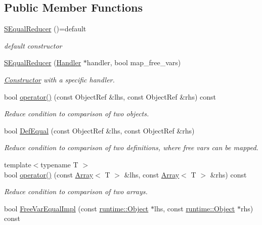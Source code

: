 \subsection*{Public Member Functions}
\begin{DoxyCompactItemize}
\item 
\hyperlink{classtvm_1_1SEqualReducer_abb85d3142af880fb96ae79423e5c382e}{S\+Equal\+Reducer} ()=default
\begin{DoxyCompactList}\small\item\em default constructor \end{DoxyCompactList}\item 
\hyperlink{classtvm_1_1SEqualReducer_a2562e028a0298c0e45d5ebbb98545fa4}{S\+Equal\+Reducer} (\hyperlink{classtvm_1_1SEqualReducer_1_1Handler}{Handler} $\ast$handler, bool map\+\_\+free\+\_\+vars)
\begin{DoxyCompactList}\small\item\em \hyperlink{classtvm_1_1Constructor}{Constructor} with a specific handler. \end{DoxyCompactList}\item 
bool \hyperlink{classtvm_1_1SEqualReducer_a530065b8aa051c777ccf5b4d71c2c66c}{operator()} (const Object\+Ref \&lhs, const Object\+Ref \&rhs) const 
\begin{DoxyCompactList}\small\item\em Reduce condition to comparison of two objects. \end{DoxyCompactList}\item 
bool \hyperlink{classtvm_1_1SEqualReducer_a62ba4c55928d4886853f9c33f4147340}{Def\+Equal} (const Object\+Ref \&lhs, const Object\+Ref \&rhs)
\begin{DoxyCompactList}\small\item\em Reduce condition to comparison of two definitions, where free vars can be mapped. \end{DoxyCompactList}\item 
{\footnotesize template$<$typename T $>$ }\\bool \hyperlink{classtvm_1_1SEqualReducer_a75b0feb43cf0a2b789170bbefb45ccf1}{operator()} (const \hyperlink{classtvm_1_1Array}{Array}$<$ T $>$ \&lhs, const \hyperlink{classtvm_1_1Array}{Array}$<$ T $>$ \&rhs) const 
\begin{DoxyCompactList}\small\item\em Reduce condition to comparison of two arrays. \end{DoxyCompactList}\item 
bool \hyperlink{classtvm_1_1SEqualReducer_af49dfe588f340f8e44dc245f2cb9a030}{Free\+Var\+Equal\+Impl} (const \hyperlink{classtvm_1_1runtime_1_1Object}{runtime\+::\+Object} $\ast$lhs, const \hyperlink{classtvm_1_1runtime_1_1Object}{runtime\+::\+Object} $\ast$rhs) const 

\end{DoxyCompactItemize}
